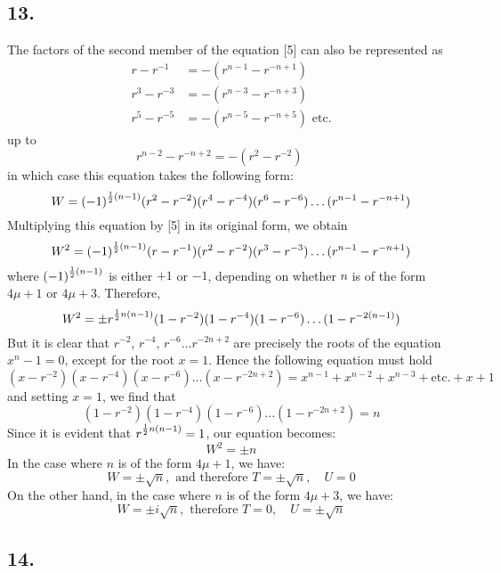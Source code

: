 \documentclass[twoside,12pt]{memoir}
\let\oldfrac\frac
\def\frac#1#2{\mathchoice{\tfrac{#1}{#2}}{\oldfrac{#1}{#2}}{\genfrac{}{}{}{2}{#1}{#2\mathstrut}}{\genfrac{}{}{}{3}{#1}{#2\mathstrut}}}
\begin{document}
\subsection*{13.}

The factors of the second member of the equation [5] can also be represented as
\[\begin{aligned}
r-r^{-1} & =-(r^{n-1}-r^{-n+1}) \\
r^{3}-r^{-3} & =-(r^{n-3}-r^{-n+3}) \\
r^{5}-r^{-5} & =-(r^{n-5}-r^{-n+5}) \text{ etc{.}}
\end{aligned}\]
up to
\[r^{n-2}-r^{-n+2}=-(r^{2}-r^{-2})\phantom{\text{ etc{.}}}\]
in which case this equation takes the following form:\pagebreak%
\[W=(-1)^{\frac{1}{2}(n-1)}(r^{2}-r^{-2})(r^{4}-r^{-4})(r^{6}-r^{-6}) \ldots (r^{n-1}-r^{-n+1})\]
Multiplying this equation by [5] in its original form, we obtain
\[W^{2}=(-1)^{\frac{1}{2}(n-1)}(r-r^{-1})(r^{2}-r^{-2})(r^{3}-r^{-3}) \ldots (r^{n-1}-r^{-n+1})\]
where \((-1)^{\frac{1}{2}(n-1)}\) is either \(+1\) or \(-1\), depending on whether \(n\) is of the form \(4 \mu+1\) or \(4 \mu+3\). Therefore,
\[W^{2}= \pm r^{\frac{1}{2} n(n-1)}(1-r^{-2})(1-r^{-4})(1-r^{-6}) \ldots(1-r^{-2(n-1)})\]
But it is clear that \(r^{-2}\), \(r^{-4}\), \(r^{-6} \ldots r^{-2 n+2}\) are precisely the roots of the equation \(x^{n}-1=0\), except for the root \(x=1\). Hence the following equation must hold
\[(x-r^{-2})(x-r^{-4})(x-r^{-6}) \ldots(x-r^{-2 n+2})=x^{n-1}+x^{n-2}+x^{n-3}+\text{etc{.}}+x+1\]
and setting \(x=1\), we find that
\[(1-r^{-2})(1-r^{-4})(1-r^{-6}) \ldots(1-r^{-2 n+2})=n\]
Since it is evident that \(r^{\frac{1}{2} n(n-1)}=1\), our equation becomes:
\[W^{2}= \pm n \tag{6}\]
In the case where \(n\) is of the form \(4 \mu+1\), we have:
\[W= \pm \sqrt{n}, \text{ and therefore } T= \pm \sqrt{n}, \quad U=0\]
On the other hand, in the case where \(n\) is of the form \(4 \mu+3\), we have:
\[W= \pm i \sqrt{n}, \text{ therefore } T=0, \quad U= \pm \sqrt{n}\]

\subsection*{14.}
\end{document}

